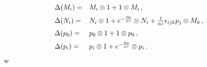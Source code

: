 \begin{equation}
\begin{array}{ll}
\Delta(M_i) = & M_i\otimes 1 + 1\otimes M_i\medskip\, ,\cr
\Delta(N_i) = & N_i\otimes 1 + e^{-\frac{p_0} {\kappa c}}\otimes
N_i + {\frac{1}{\kappa c}}\epsilon_{ijk}p_j\otimes M_k\, ,
\medskip\cr \Delta(p_0) = & p_0\otimes 1 + 1\otimes p_0\, ,\medskip\cr
\Delta(p_i) = & p_i\otimes 1 + e^{-{\frac{p_0}{\kappa c}}}\otimes
p_i\, .\end{array}\label{r23}\end{equation}w
